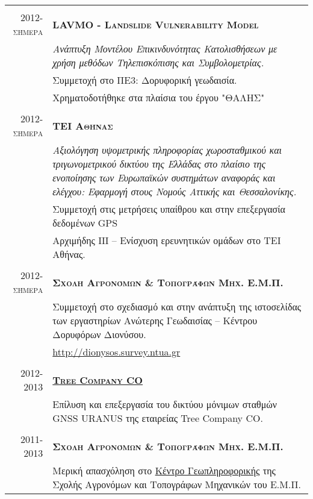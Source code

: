 \documentclass[a4paper,10pt]{article} %
\begin{document}
\begin{longtable}{r|p{13cm}}
\multicolumn{2}{c}{} \\ 
\textsc{2012-σήμερα} & \textsc{\textbf{LAVMO - Landslide Vulnerability Model}}\\
  & \textit{Ανάπτυξη Μοντέλου Επικινδυνότητας Κατολισθήσεων με χρήση μεθόδων Τηλεπισκόπισης και Συμβολομετρίας.}\\
  & Συμμετοχή στο ΠΕ3: Δορυφορική γεωδαισία.\\
  & Χρηματοδοτήθηκε στα πλαίσια του έργου "ΘΑΛΗΣ"\\

\multicolumn{2}{c}{} \\
\textsc{2012-σήμερα} & \textbf{\textsc{ΤΕΙ Αθήνας}}\\
  & \textit{Αξιολόγηση υψομετρικής πληροφορίας χωροσταθμικού και τριγωνομετρικού δικτύου της Ελλάδας στο πλαίσιο της ενοποίησης των Ευρωπαϊκών συστημάτων αναφοράς και ελέγχου: Εφαρμογή στους Νομούς Αττικής και Θεσσαλονίκης.}\\
  & Συμμετοχή στις μετρήσεις υπαίθρου και στην επεξεργασία δεδομένων GPS\\
  & Αρχιμήδης ΙΙΙ – Ενίσχυση ερευνητικών ομάδων στο ΤΕΙ Αθήνας.\\

\multicolumn{2}{c}{} \\
\textsc{2012-σήμερα} & \textbf{\textsc{Σχολή Αγρονόμων \& Τοπογράφων Μηχ. Ε.Μ.Π.}}\\
  & Συμμετοχή στο σχεδιασμό και στην ανάπτυξη της ιστοσελίδας των εργαστηρίων Ανώτερης Γεωδαισίας – Κέντρου Δορυφόρων Διονύσου.\\
  & \url{http://dionysos.survey.ntua.gr}\\

\multicolumn{2}{c}{} \\
\textsc{2012-2013} & \textbf{\textsc{\href{http://www.treecomp.gr/}{Tree Company CO}}}\\
  & Επίλυση και επεξεργασία του δικτύου μόνιμων σταθμών GNSS URANUS της εταιρείας Tree Company CO.\\

\multicolumn{2}{c}{} \\
\textsc{2011-2013} & \textbf{\textsc{Σχολή Αγρονόμων \& Τοπογράφων Μηχ. Ε.Μ.Π.}}\\
  & Μερική απασχόληση στο \href{http://portal.survey.ntua.gr/main/geocenter/geocen-g.html}{Κέντρο Γεωπληροφορικής} της Σχολής Αγρονόμων και Τοπογράφων Μηχανικών του Ε.Μ.Π.\\


\end{longtable}
\end{document}
